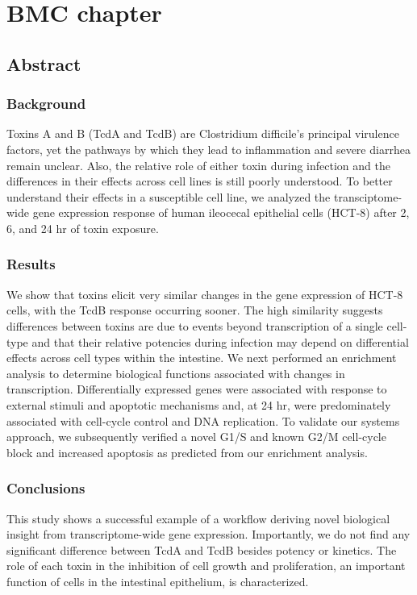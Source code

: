 \chapter{ BMC chapter }

\section{Abstract}

\subsection{Background}
Toxins A and B (TcdA and TcdB) are Clostridium difficile’s principal virulence factors, yet the pathways by which they lead to inflammation and severe diarrhea remain unclear. Also, the relative role of either toxin during infection and the differences in their effects across cell lines is still poorly understood. To better understand their effects in a susceptible cell line, we analyzed the transciptome-wide gene expression response of human ileocecal epithelial cells (HCT-8) after 2, 6, and 24 hr of toxin exposure. 

\subsection{Results}
We show that toxins elicit very similar changes in the gene expression of HCT-8 cells, with the TcdB response occurring sooner. The high similarity suggests differences between toxins are due to events beyond transcription of a single cell-type and that their relative potencies during infection may depend on differential effects across cell types within the intestine. We next performed an enrichment analysis to determine biological functions associated with changes in transcription. Differentially expressed genes were associated with response to external stimuli and apoptotic mechanisms and, at 24 hr, were predominately associated with cell-cycle control and DNA replication. To validate our systems approach, we subsequently verified a novel G1/S and known G2/M cell-cycle block and increased apoptosis as predicted from our enrichment analysis. 

\subsection{Conclusions}
This study shows a successful example of a workflow deriving novel biological insight from transcriptome-wide gene expression. Importantly, we do not find any significant difference between TcdA and TcdB besides potency or kinetics. The role of each toxin in the inhibition of cell growth and proliferation, an important function of cells in the intestinal epithelium, is characterized.

